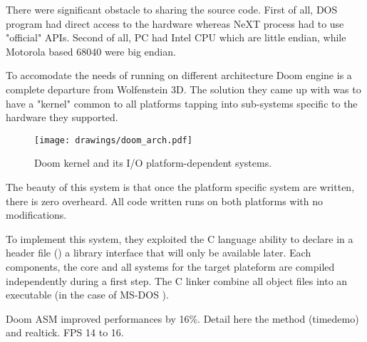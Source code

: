 There were significant obstacle to sharing the source code. First of all, DOS program had direct access to the hardware whereas NeXT process had to use "official" APIs. Second of all, PC had Intel CPU which are little endian, while Motorola based 68040 were big endian.\\
\par
{}
\par
{}
\par
{}
\par
To accomodate the needs of running on different architecture Doom engine is a complete departure from Wolfenstein 3D. The solution they came up with was to have a "kernel" common to all platforms tapping into sub-systems specific to the hardware they supported.\\
\par
\begin{figure}[H]
\centering
\texttt{[image: drawings/doom\_arch.pdf]}
\caption{Doom kernel and its I/O platform-dependent systems.}
\end{figure}
\par
The beauty of this system is that once the platform specific system are written, there is zero overheard. All code written runs on both platforms with no modifications.
\par
To implement this system, they exploited the C language ability to declare in a header file () a library interface that will only be available later. Each components, the core and all systems for the target plateform are compiled independently during a first step. The C linker combine all object files into an executable (in the case of MS-DOS ).\\
\par
{}
\par
Doom ASM improved performances by 16\%. Detail here the method (timedemo) and realtick. FPS 14 to 16.\\
\par


